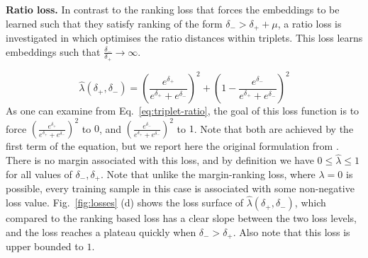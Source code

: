 \textbf{Ratio loss.} In contrast to the ranking loss that forces the embeddings to be learned such that they satisfy ranking of the form
$\delta_{-}>\delta_{+}+\mu$, a ratio loss is investigated in
\cite{DBLP:journals/corr/HofferA14} which optimises the ratio
distances within triplets. This loss learns embeddings such that
$\frac{\delta_{-}}{\delta_{+}}\rightarrow \infty$.

\begin{equation}
  \label{eq:triplet-ratio}
  \hat{\lambda}(\delta_+,\delta_-) = (\frac{e^{\delta_+}}{e^{\delta_+}+e^{\delta_-}})^2+(1-\frac{e^{\delta_-}}{e^{\delta_+}+e^{\delta_-}})^{2}
\end{equation}
As one can examine from Eq.~\ref{eq:triplet-ratio}, the goal of this
loss function is to force
$(\frac{e^{\delta_+}}{e^{\delta_+}+e^{\delta_-}})^2$ to $0$, and
$(\frac{e^{\delta_-}}{e^{\delta_+}+e^{\delta_-}})^2$ to $1$. Note that
both are achieved by the first term of the equation, but we
report here the original formulation from
\cite{DBLP:journals/corr/HofferA14}.  There is no margin associated
with this loss, and by definition we have
$0 \leq \hat{\lambda} \leq 1$ for all values of
$\delta_{-},\delta_{+}$.  Note that unlike the margin-ranking loss,
where $\lambda=0$ is possible, every training sample in this case is
associated with some non-negative loss value.  Fig.~\ref{fig:losses}
(d) shows the loss surface of $\hat{\lambda}(\delta_+,\delta_-)$,
which compared to the ranking based loss has a clear slope between the
two loss levels, and the loss reaches a plateau quickly when
$\delta_{-} > \delta_{+}$. Also note that this loss is upper bounded
to $1$.

